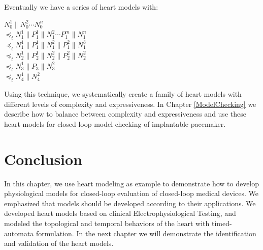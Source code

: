 Eventually we have a series of heart models with:

$N_0^1\|N_0^2\cdots N_0^n$\\
$\preceq_t N_1^1\|P_1^1\|N_1^2\cdots P_1^{m}\|N_1^n$\\
$\preceq_t N_1^1\| P_1^1 \| N_1^2\| P_1^2 \| N_1^3$\\
$\preceq_t N_2^1\| P_2^1\| N_2^2\| P_2^2\| N_2^2$\\
$\preceq_t N_3^1\| P_3\| N_3^2$\\
$\preceq_t N_4^1\| N_4^2$

Using this technique, we systematically create a family of heart models with different levels of complexity and expressiveness. In Chapter \ref{ModelChecking} we describe how to balance between complexity and expressiveness and use these heart models for closed-loop model checking of implantable pacemaker.
\section{Conclusion}
In this chapter, we use heart modeling as example to demonstrate how to develop physiological models for closed-loop evaluation of closed-loop medical devices. We emphasized that models should be developed according to their applications. We developed heart models based on clinical Electrophysiological Testing, and modeled the topological and temporal behaviors of the heart with timed-automata formulation. In the next chapter we will demonstrate the identification and validation of the heart models.


